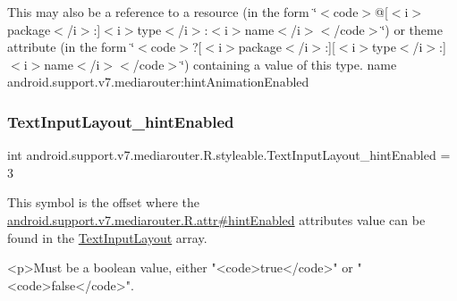 This may also be a reference to a resource (in the form \char`\"{}$<$code$>$@\mbox{[}$<$i$>$package$<$/i$>$\+:\mbox{]}$<$i$>$type$<$/i$>$\+:$<$i$>$name$<$/i$>$$<$/code$>$\char`\"{}) or theme attribute (in the form \char`\"{}$<$code$>$?\mbox{[}$<$i$>$package$<$/i$>$\+:\mbox{]}\mbox{[}$<$i$>$type$<$/i$>$\+:\mbox{]}$<$i$>$name$<$/i$>$$<$/code$>$\char`\"{}) containing a value of this type.  name android.\+support.\+v7.\+mediarouter\+:hint\+Animation\+Enabled \mbox{\label{classandroid_1_1support_1_1v7_1_1mediarouter_1_1R_1_1styleable_a3a615e7612252cf50e0e7e212dae5195}} 
\subsubsection{\texorpdfstring{Text\+Input\+Layout\+\_\+hint\+Enabled}{TextInputLayout\_hintEnabled}}
{\footnotesize\ttfamily int android.\+support.\+v7.\+mediarouter.\+R.\+styleable.\+Text\+Input\+Layout\+\_\+hint\+Enabled = 3\hspace{0.3cm}{\ttfamily [static]}}

This symbol is the offset where the \hyperlink{classandroid_1_1support_1_1v7_1_1mediarouter_1_1R_1_1attr_adb3d7bb0e53eda2fa97659c87c5fb8d1}{android.\+support.\+v7.\+mediarouter.\+R.\+attr\#hint\+Enabled} attribute\textquotesingle{}s value can be found in the \hyperlink{classandroid_1_1support_1_1v7_1_1mediarouter_1_1R_1_1styleable_a935a5feb3f0394eb1c07f26b207dfb2d}{Text\+Input\+Layout} array.

\begin{DoxyVerb}      <p>Must be a boolean value, either "<code>true</code>" or "<code>false</code>".
\end{DoxyVerb}
 

